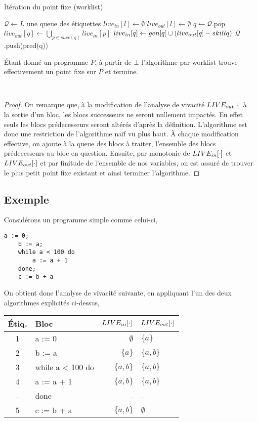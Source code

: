 \documentclass[a4paper, 12pt]{article}
\begin{document}
\begin{algorithm}
	\caption{Itération du point fixe (worklist)}
	\begin{algorithmic}
		\State $\mathcal{Q} \leftarrow L$ une queue des étiquettes
		\State $live_{in}[l] \leftarrow \emptyset$
		\State $live_{out}[l] \leftarrow \emptyset$
		\EndFor
		\State $q \leftarrow \mathcal{Q}$.pop
		\State $live_{out}[q] \leftarrow \bigcup\limits_{p\in succ(q)} live_{in}[p]$
		\State $live_{in}[q] \leftarrow gen[q] \cup (live_{out}[q] - skill{q})$
		\State $\mathcal{Q}$.push(pred(q))
		\EndIf
		\EndWhile
	\end{algorithmic}
\end{algorithm}
\noindent
\begin{lemma}
	Étant donné un programme $P$, à partir de $\bot$ l'algorithme par worklist trouve effectivement
	un point fixe sur $P$ et termine.
\end{lemma}
\\
\begin{proof}
On remarque que, à la modification de l'analyse de vivacité $LIVE_{out}[\cdot]$ à la sortie d'un bloc,
les blocs successeurs ne seront nullement impactés. En effet seuls les blocs prédecesseurs seront
altérés d'après la définition. L'algorithme est donc une restriction de l'algorithme naïf vu plus
haut. À chaque modification effective, on ajoute à la queue des blocs à traiter, l'ensemble des blocs
prédecesseurs au bloc en question. Ensuite, par monotonie de $LIVE_{in}[\cdot]$ et $LIVE_{out}[\cdot]$ et
par finitude de l'ensemble de nos variables, on est assuré de trouver le plus petit point fixe existant
et ainsi terminer l'algorithme.	
\end{proof}
\subsection{Exemple}
\noindent
Considérons un programme simple comme celui-ci,
\begin{lstlisting}[tabsize=2]
	a := 0;
	b := a;
	while a < 100 do
		a := a + 1
	done;
	c := b + a
\end{lstlisting}
On obtient donc l'analyse de vivacité suivante, en appliquant l'un des deux algorithmes explicités ci-dessus,
\\
\begin{center}
	\begin{tabular}{||c|l|r|l||}
	\hline
	Étiq. & Bloc & $LIVE_{in}[\cdot]$ & $LIVE_{out}[\cdot]$ \\
	\hline
	1 & a := 0 & $\emptyset$ & $\{a\}$\\
	2 & b := a & $\{a\}$ & $\{a, b\}$\\
	3 & while a < 100 do & $\{a, b\}$ & $\{a, b\}$\\
	4 & a := a + 1 & $\{a, b\}$ & $\{a, b\}$\\
	- & done & - & -\\
	5 & c := b + a & $\{a, b\}$ & $\emptyset$\\
	\hline
	\end{tabular}
\end{center}
\end{document}
